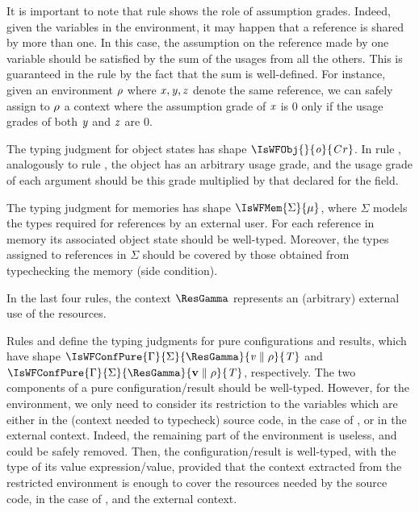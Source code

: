 \begin{remark}\label{rem:checking}
It is important to note that rule  shows the role of assumption grades. Indeed, given the variables in the environment, it may happen that a reference is shared by more than one. 
In this case, the assumption on the reference made by one variable should be satisfied by the sum of the usages from all the others. This is guaranteed in the rule by the fact that the sum is well-defined. For instance, given an environment $\rho$ where $\mathit{x},\mathit{y},\mathit{z}$ denote the same reference, we can safely assign to $\rho$ a context where the assumption grade of $\mathit{x}$ is $0$ only if the usage grades of both $\mathit{y}$ and $\mathit{z}$ are $0$. 
\end{remark}



The typing judgment for object states has shape $\IsWFObj{}{\obj}{\Graded{\C}{}{\rgr}}$. 
\bez
In rule , analogously to rule , the object has an arbitrary usage grade, and the usage grade of each argument should be this grade multiplied by that declared for the field. 
\eez

The typing judgment for memories has shape $\IsWFMem{\Sigma}{\mem}$, where $\Sigma$ models the types required for references  by an external user.
For each reference in memory its associated object state should be well-typed.
Moreover, the types assigned to references in $\Sigma$ should be covered by those obtained from typechecking the memory (side condition).   



In the last four rules, the context $\ResGamma$ represents an (arbitrary) external use of the resources. 

Rules  and  define the typing judgments for pure configurations and results, which have shape $\IsWFConfPure{\Gamma}{\Sigma}{\ResGamma}{\VConf{\ve}{\env}}{\T}$ and $\IsWFConfPure{\Gamma}{\Sigma}{\ResGamma}{\VConf{\val}{\env}}{\T}$, respectively. The two components of a pure configuration/result should be well-typed. However, for the environment, we only need to consider its restriction to the variables which are either in the (context needed to typecheck) source code, in the case of , or in the external context. Indeed, the remaining part of the environment is useless, and could be safely removed. 
Then, the configuration/result is well-typed, with the type of its value expression/value, provided that the context extracted from the  restricted environment is enough to cover the resources needed by the source code, in the case of , and  the external context.

